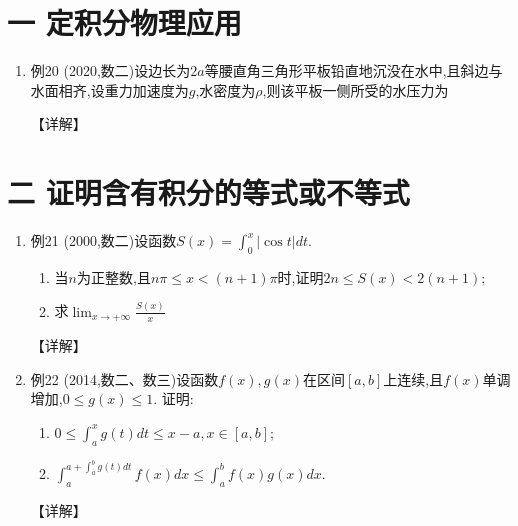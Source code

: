 \documentclass[12pt, a4paper, oneside, UTF8]{ctexbook}
\begin{document}
\section{一 定积分物理应用}

\begin{enumerate}[label=\arabic*.,start=19]
    \item 例20 (2020,数二)设边长为$2a$等腰直角三角形平板铅直地沉没在水中,且斜边与水面相齐,设重力加速度为$g$,水密度为$\rho$,则该平板一侧所受的水压力为
    
    \begin{solution}
    【详解】
    \end{solution}
\end{enumerate}

\section{二 证明含有积分的等式或不等式}

\begin{enumerate}[label=\arabic*.,start=20]
    \item 例21 (2000,数二)设函数$S(x)=\int_0^x|\cos t| dt$.
    \begin{enumerate}[label=(\roman*)]
        \item 当$n$为正整数,且$n\pi\leq x<(n+1)\pi$时,证明$2n\leq S(x)<2(n+1)$;
        \item 求$\lim_{x\to+\infty}\frac{S(x)}{x}$
    \end{enumerate}
    
    \begin{solution}
    【详解】
    \end{solution}
    
    \item 例22 (2014,数二、数三)设函数$f(x), g(x)$在区间$[a, b]$上连续,且$f(x)$单调增加,$0\leq g(x)\leq 1$.
    证明:
    \begin{enumerate}[label=(\roman*)]
        \item $0\leq\int_a^x g(t) dt\leq x-a, x\in[a, b]$;
        \item $\int_a^{a+\int_a^b g(t) dt} f(x) dx\leq\int_a^b f(x) g(x) dx$.
    \end{enumerate}
    
    \begin{solution}
    【详解】
    \end{solution}
\end{enumerate}

\ifx\allfiles\undefined
\end{document}
